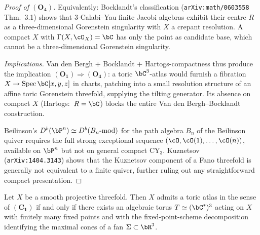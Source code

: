 \begin{proof}[Proof of $(\mathbf{O_4})$]
Equivalently: Bocklandt's classification (\texttt{arXiv:math/0603558}
Thm.~3.1) shows that $3$-Calabi--Yau finite Jacobi algebras exhibit
their centre $R$ as a three-dimensional Gorenstein singularity with $X$
a crepant resolution. A compact $X$ with $\Gamma(X, \cO_X) = \bC$ has
only the point as candidate base, which cannot be a three-dimensional
Gorenstein singularity.

\emph{Implications.}
Van den Bergh + Bocklandt + Hartogs-compactness thus produce the
implication $(\mathbf{O_1}) \Rightarrow (\mathbf{O_4})$: a toric
$\bC^3$-atlas would furnish a fibration $X \to \mathrm{Spec}\,\bC[x,y,z]$
in charts, patching into a small resolution structure of an affine
toric Gorenstein threefold, supplying the tilting generator. Its
absence on compact $X$ (Hartogs:\ $R = \bC$) blocks the entire
Van den Bergh--Bocklandt construction.

Beilinson's $D^b(\bP^n) \simeq D^b(B_n\text{-mod})$ for the path algebra
$B_n$ of the Beilinson quiver requires the full strong exceptional
sequence $(\cO, \cO(1), \dots, \cO(n))$, available on $\bP^n$ but not
on general compact CY$_3$. Kuznetsov (\texttt{arXiv:1404.3143}) shows
that the Kuznetsov component of a Fano threefold is generally not
equivalent to a finite quiver, further ruling out any straightforward
compact presentation.
\end{proof}

\begin{proposition}
\label{prop:sumihiro-biconditional}
Let $X$ be a smooth projective threefold. Then $X$ admits a toric
atlas in the sense of $(\mathbf{C_1})$ if and only if there exists an
algebraic torus $T \simeq (\bC^\ast)^3$ acting on $X$ with finitely
many fixed points and with the fixed-point-scheme decomposition
identifying the maximal cones of a fan $\Sigma \subset \bR^3$.
\end{proposition}

